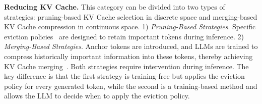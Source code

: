 \textbf{Reducing KV Cache.}
This category can be divided into two types of strategies: pruning-based KV Cache selection in discrete space and merging-based KV Cache compression in continuous space.
1) \textit{Pruning-Based Strategies}.
Specific eviction policies~\citep{nips23_h2o, iclr24_streamingllm,arxiv24_sepllm} are designed to retain important tokens during inference.
2) \textit{Merging-Based Strategies}.
Anchor tokens are introduced, and LLMs are trained to compress historically important information into these tokens, thereby achieving KV Cache merging~\citep{acl24_anllm}.
Both strategies require intervention during inference. 
The key difference is that the first strategy is training-free but applies the eviction policy for every generated token, while the second is a training-based method and allows the LLM to decide when to apply the eviction policy.
